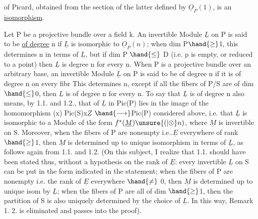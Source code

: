 of Picard, obtained from the section of the latter defined by $\underline{O}_P(1)$, is an
\uline{isomorphism}.

Let P be a projective bundle over a field k. An invertible Module
$\underline{L}$ on P is said to be \uline{of degree} n if $\underline{L}$ is isomorphic to $\underline{O}_P(n)$; when
dim P$\hand{\geq}$1, this determines n in terms of $\underline{L}$, but if dim P $\hand{\leq}$ D
(i.e. p is empty, or reduced to a point) then $\underline{L}$ is degree n for every n.
When P is a projective bundle over an arbitrary base, an invertible
Module $\underline{L}$ on P is said to be of degree n if it is of degree n on every fibr
This determines n, except if all the fibers of P/S are of dim$\hand{\leq}$0, then
$\underline{L}$ is of degree n for every n. To say that $\underline{L}$ is of degree n also means,
by 1.1. and 1.2., that   of $\underline{L}$ in Pic(P) lies in
the image of  the homomorphism (x) Pic(S)x$\underline{Z}$ $\hand{\longrightarrow}$Pic(P) considered above,
i.e. that $\underline{L}$ is isomorphic to a Module of the form $f^*(\underline{M})\unsure{(|\otimes}n)$, where $\underline{M}$ is
invertible on S. Moreover, when the fibers of P are nonempty
i.e..$\underline{E}$ everywhere of rank $\hand{\geq}$1, then $\underline{M}$ is determined up to unique isomorphism
in terms of $\underline{L}$, as follows again from 1.1. and 1.2. (On this
subject, I realize that 1.1. should have been stated thus, without a hypothesis
on the rank of $\underline{E}$: every invertible $\underline{L}$ on S can be put in the form
indicated in the statement; when the fibers of P are nonempty i.e. the
rank of $\underline{E}$ everywhere $\hand{\neq}$ 0, then $\underline{M}$ is determined up to unique isom by
$\underline{L}$; when the fibers of P are all of dim $\hand{\geq}$1,  then the partition
of S is also uniquely determined by the choice of $\underline{L}$. In this
way, Remark 1. 2. is eliminated and passes into the proof).

